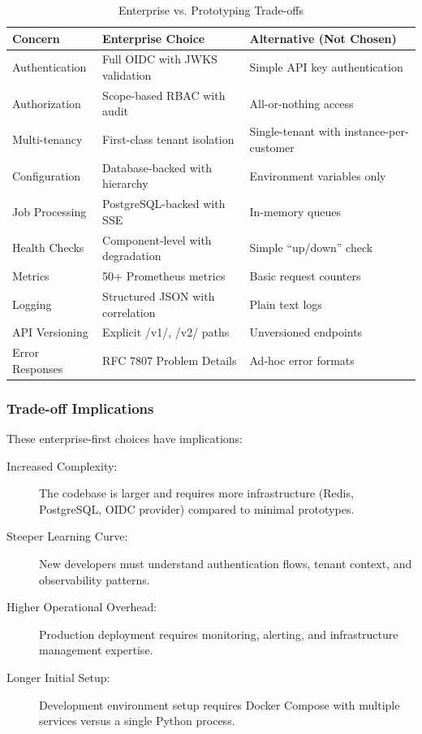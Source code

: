 \begin{table}[htbp]
\centering
\caption{Enterprise vs. Prototyping Trade-offs}
\label{tab:enterprise-tradeoffs}
\small
\begin{tabularx}{\textwidth}{|l|X|X|}
\hline
\textbf{Concern} & \textbf{Enterprise Choice} & \textbf{Alternative (Not Chosen)} \\
\hline
Authentication & Full OIDC with JWKS validation & Simple API key authentication \\
\hline
Authorization & Scope-based RBAC with audit & All-or-nothing access \\
\hline
Multi-tenancy & First-class tenant isolation & Single-tenant with instance-per-customer \\
\hline
Configuration & Database-backed with hierarchy & Environment variables only \\
\hline
Job Processing & PostgreSQL-backed with SSE & In-memory queues \\
\hline
Health Checks & Component-level with degradation & Simple ``up/down'' check \\
\hline
Metrics & 50+ Prometheus metrics & Basic request counters \\
\hline
Logging & Structured JSON with correlation & Plain text logs \\
\hline
API Versioning & Explicit /v1/, /v2/ paths & Unversioned endpoints \\
\hline
Error Responses & RFC 7807 Problem Details & Ad-hoc error formats \\
\hline
\end{tabularx}
\end{table}

\subsubsection{Trade-off Implications}

These enterprise-first choices have implications:

\begin{description}
    \item[Increased Complexity:] The codebase is larger and requires more infrastructure (Redis, PostgreSQL, OIDC provider) compared to minimal prototypes.
    
    \item[Steeper Learning Curve:] New developers must understand authentication flows, tenant context, and observability patterns.
    
    \item[Higher Operational Overhead:] Production deployment requires monitoring, alerting, and infrastructure management expertise.
    
    \item[Longer Initial Setup:] Development environment setup requires Docker Compose with multiple services versus a single Python process.
\end{description}

